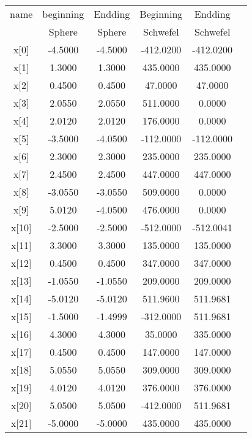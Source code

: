 \documentclass{article}
\begin{document}
\begin{CJK}{UTF8}{gbsn}
\begin{table}[!hbp]  
\begin{tabular}{|c|c|c|c|c|c|}   
\hline %
\hline %
name        & beginning        & Endding            & Beginning     & Endding \\
            & Sphere           & Sphere             & Schwefel      & Schwefel  \\
\hline
x[0]	&	-4.5000	&	-4.5000	&	-412.0200	&	-412.0200	\\
\hline
x[1]	&	 1.3000	&	 1.3000	&	 435.0000	&	 435.0000	\\
\hline
x[2]	&	 0.4500	&	 0.4500	&	  47.0000	&	  47.0000	\\
\hline
x[3]	&	 2.0550	&	 2.0550	&	 511.0000	&	   0.0000	\\
\hline
x[4]	&	 2.0120	&	 2.0120	&	 176.0000	&	   0.0000	\\
\hline
x[5]	&	-3.5000	&	-4.0500	&	-112.0000	&	-112.0000	\\
\hline
x[6]	&	 2.3000	&	 2.3000	&	 235.0000	&	 235.0000	\\
\hline
x[7]	&	 2.4500	&	 2.4500	&	 447.0000	&	 447.0000	\\
\hline
x[8]	&	-3.0550	&	-3.0550	&	 509.0000	&	   0.0000	\\
\hline
x[9]	&	 5.0120	&	-4.0500	&	 476.0000	&	   0.0000	\\
\hline
x[10]	&	-2.5000	&	-2.5000	&	-512.0000	&	-512.0041	\\
\hline
x[11]	&	 3.3000	&	 3.3000	&	 135.0000	&	 135.0000	\\
\hline
x[12]	&	 0.4500	&	 0.4500	&	 347.0000	&	 347.0000	\\
\hline
x[13]	&	-1.0550	&	-1.0550	&	 209.0000	&	 209.0000	\\
\hline
x[14]	&	-5.0120	&	-5.0120	&	 511.9600	&	 511.9681	\\
\hline
x[15]	&	-1.5000	&	-1.4999	&	-312.0000	&	 511.9681	\\
\hline
x[16]	&	 4.3000	&	 4.3000	&	  35.0000	&	 335.0000	\\
\hline
x[17]	&	 0.4500	&	 0.4500	&	 147.0000	&	 147.0000	\\
\hline
x[18]	&	 5.0550	&	 5.0550	&	 309.0000	&	 309.0000	\\
\hline
x[19]	&	 4.0120	&	 4.0120	&	 376.0000	&	 376.0000	\\
\hline
x[20]	&	 5.0500	&	 5.0500	&	-412.0000	&	 511.9681	\\
\hline
x[21]	&	-5.0000	&	-5.0000	&	 435.0000	&	 435.0000	\\

\end{tabular}
\end{table}
\end{CJK}
\end{document}
